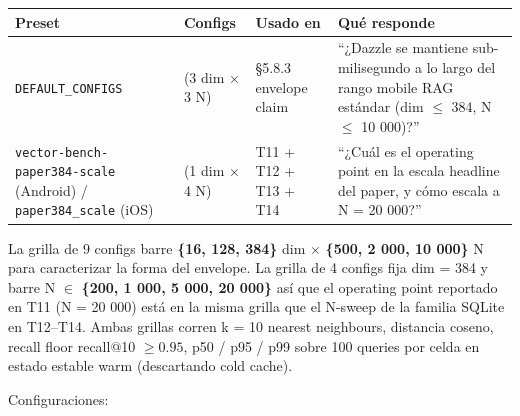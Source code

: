 {\def\LTcaptype{none} %
\begin{longtable}[]{@{}
  >{\raggedright\arraybackslash}p{}
  >{\raggedleft\arraybackslash}p{}
  >{\raggedright\arraybackslash}p{}
  >{\raggedright\arraybackslash}p{}@{}}
\toprule\noalign{}
\begin{minipage}[b]{\linewidth}\raggedright
Preset
\end{minipage} & \begin{minipage}[b]{\linewidth}\raggedleft
Configs
\end{minipage} & \begin{minipage}[b]{\linewidth}\raggedright
Usado en
\end{minipage} & \begin{minipage}[b]{\linewidth}\raggedright
Qué responde
\end{minipage} \\
\midrule\noalign{}
\endhead
\bottomrule\noalign{}
\endlastfoot
\texttt{DEFAULT\_CONFIGS} & 9 (3 dim \(\times\) 3 N) & §5.8.3 envelope claim &
``¿Dazzle se mantiene sub-milisegundo a lo largo del rango mobile RAG estándar
(dim \(\leq\) 384, N \(\leq\) 10 000)?'' \\
\texttt{vector-bench-paper384-scale} (Android) / \texttt{paper384\_scale} (iOS)
& 4 (1 dim \(\times\) 4 N) & T11 + T12 + T13 + T14 & ``¿Cuál es el operating
point en la escala headline del paper, y cómo escala a N = 20 000?'' \\
\end{longtable}
}

La grilla de 9 configs barre \textbf{\{16, 128, 384\}} dim \(\times\)
\textbf{\{500, 2 000, 10 000\}} N para caracterizar la forma del envelope. La
grilla de 4 configs fija dim = 384 y barre N \(\in\) \textbf{\{200, 1 000, 5
000, 20 000\}} así que el operating point reportado en T11 (N = 20 000) está en
la misma grilla que el N-sweep de la familia SQLite en T12--T14. Ambas grillas
corren k = 10 nearest neighbours, distancia coseno, recall floor recall@10
\(\geq 0.95\), p50 / p95 / p99 sobre 100 queries por celda en estado estable
warm (descartando cold cache).

Configuraciones:

